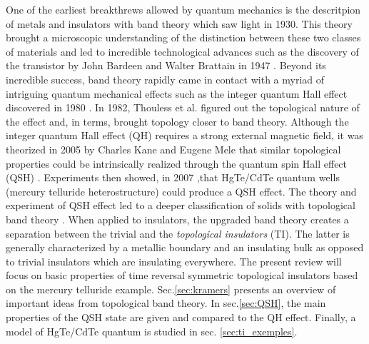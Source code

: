 One of the earliest breakthrews allowed by quantum mechanics is the descritpion of metals and insulators with band theory \cite{hoddeson_development_1987} which saw light in 1930. This theory brought a microscopic understanding of the distinction between these two classes of materials and led to incredible technological advances such as the discovery of the transistor by John Bardeen and Walter Brattain in 1947 \cite{brinkman_history_1997}. Beyond its incredible success,  band theory rapidly came in contact with a myriad of intriguing quantum mechanical effects such as the integer quantum Hall effect discovered in 1980 \cite{klitzing_new_1980}. In 1982, Thouless et al. \cite{cayssol_topological_2021} figured out the topological nature of the effect and, in terms, brought topology closer to band theory. Although the integer quantum Hall effect (QH) requires a strong external magnetic field, it was theorized in 2005 by Charles Kane and Eugene Mele \cite{kane_quantum_2005} that similar topological properties could be intrinsically realized  through the quantum spin Hall effect (QSH) \cite{qi_quantum_2010}. Experiments then showed, in 2007 \cite{koenig_quantum_2007},that HgTe/CdTe
quantum wells (mercury telluride heterostructure) could produce a QSH effect. The theory and experiment of QSH effect led to a deeper classification of solids with topological band theory \cite{soluyanov_topological_nodate}. When applied to insulators, the upgraded band theory creates a separation between the trivial and the \textit{topological insulators} (TI). The latter is generally characterized by a metallic boundary and an insulating bulk \cite{moore_birth_2010} as opposed to trivial insulators which are insulating everywhere. The present review will focus on basic properties of time reversal symmetric topological insulators based on the mercury telluride example. Sec.\ref{sec:kramers} presents an overview of important ideas from topological band theory. In sec.\ref{sec:QSH}, the main properties of the QSH state are given and compared to the QH effect. Finally, a model of HgTe/CdTe
quantum is studied in sec. \ref{sec:ti_exemples}. 